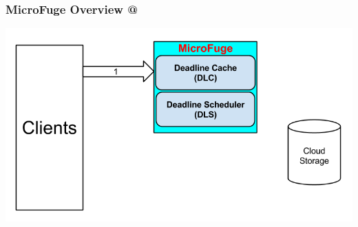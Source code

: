 \documentclass{beamer}
\makeatletter
\newcommand*{\rom}[1]{\expandafter\@slowromancap\romannumeral #1@}
\newcommand{\myv}{\vspace{3 mm}}
\makeatother
\begin{document}


\begin{frame}
  \frametitle{MicroFuge Overview \rom{1}}
  \begin{center}
    \includegraphics[scale=0.39]{img/MF_FULL_V8_2.png}
  \end{center}
\end{frame}
\end{document}
